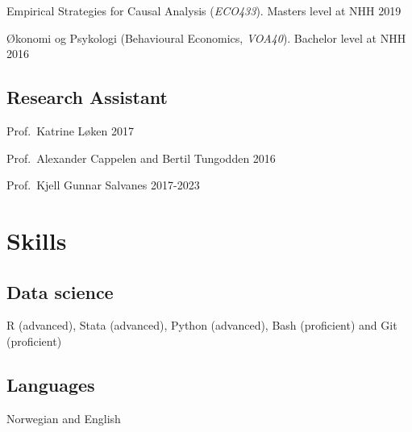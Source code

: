 \documentclass[11pt,]{article}
\begin{document}
Empirical Strategies for Causal Analysis (\emph{ECO433}). Masters level
at NHH \hfill 2019\vspace{-0.2cm}

Økonomi og Psykologi (Behavioural Economics, \emph{VOA40}). Bachelor
level at NHH \hfill 2016\vspace{-0.2cm}

\vspace{0.5cm}

\hypertarget{research-assistant}{%
\subsection{Research Assistant}\label{research-assistant}}

Prof.~Katrine Løken \hfill 2017\vspace{-0.2cm}

Prof.~Alexander Cappelen and Bertil Tungodden \hfill 2016\vspace{-0.2cm}

Prof.~Kjell Gunnar Salvanes \hfill 2017-2023\vspace{-0.2cm}

\vspace{0.5cm}

\hypertarget{skills}{%
\section{Skills}\label{skills}}

\hypertarget{data-science}{%
\subsection{Data science}\label{data-science}}

R (advanced), Stata (advanced), Python (advanced), Bash (proficient) and
Git (proficient)\vspace{-0.2cm}

\vspace{0.5cm}

\vspace{-0.3cm}

\hypertarget{languages}{%
\subsection{Languages}\label{languages}}

Norwegian and English\vspace{-0.2cm}

\vspace{0.5cm}
\end{document}
